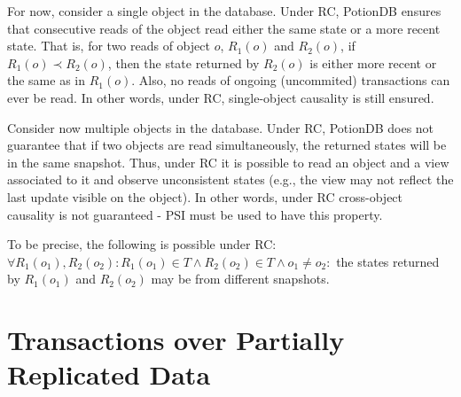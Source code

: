 \documentclass{vldb}
\newcommand{\grumbler}[2]{{\color{red}{\bf #1:} #2}}
\renewcommand{\grumbler}[2]{}
\newcommand{\andre}[1]{\grumbler{andre}{#1}}
\begin{document}
For now, consider a single object in the database.
Under RC, PotionDB ensures that consecutive reads of the object read either the same state or a more recent state.
That is, for two reads of object $o$, $R_1(o)$ and $R_2(o)$, if $R_1(o) \prec R_2(o)$, then the state returned by $R_2(o)$ is either more recent or the same as in $R_1(o)$.
Also, no reads of ongoing (uncommited) transactions can ever be read.
In other words, under RC, single-object causality is still ensured.

Consider now multiple objects in the database.
Under RC, PotionDB does not guarantee that if two objects are read simultaneously, the returned states will be in the same snapshot.
Thus, under RC it is possible to read an object and a view associated to it and observe unconsistent states (e.g., the view may not reflect the last update visible on the object).
In other words, under RC cross-object causality is not guaranteed - PSI must be used to have this property.

To be precise, the following is possible under RC:
$\forall R_1(o_1), R_2(o_2) : R_1(o_1) \in T \land R_2(o_2) \in T \land o_1 \not= o_2 :$ the states returned by $R_1(o_1)$ and $R_2(o_2)$ may be from different snapshots.

\andre{Do I need/should I do the correspondent property to the one above in the PSI section?}



%
%



\section{Transactions over Partially Replicated Data}

\andre{The formal definition of PotionDB is already in section 3...}
\end{document}
